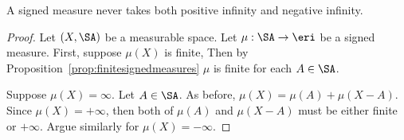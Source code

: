 \begin{prop}
A signed measure never takes
both positive infinity and
negative infinity.
\begin{proof}
Let $(X,\SA)$ be a measurable space.
Let $\mu: \SA \to \eri$ be a signed measure.
First, suppose $\mu(X)$ is finite,
Then by
Proposition~\ref{prop:finitesignedmeasures}
$\mu$ is finite for each $A \in \SA$.

Suppose $\mu(X) = \infty$.
Let $A \in \SA$.
As before,
$\mu(X) = \mu(A) + \mu(X - A)$.
Since $\mu(X) = +\infty$, then
both of $\mu(A)$ and $\mu(X-A)$
must be either finite or $+\infty$.
Argue similarly for $\mu(X) = -\infty$.
\end{proof}
\end{prop}
\strats
